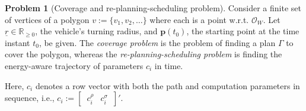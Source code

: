 \documentclass[letterpaper,10pt,journal,twoside]{IEEEtran}
\theoremstyle{definition}
\newtheorem*{pb}{Problem}%
\begin{document}
\begin{pb}[Coverage and re-planning-scheduling problem]
  \label{pb:cov-pb}
  Consider a finite set of vertices of a polygon $v:=\{v_1,v_2,\dots\}$ where each %
  is a point w.r.t. $\mathcal{O}_W$. 
  Let $\underline{r}\in\mathbb{R}_{\geq 0}$, the vehicle's turning radius, and $\mathbf{p}(t_0)$, the starting point at the time instant $t_0$, be given. 
  The \emph{coverage problem} is the problem of finding a plan $\Gamma$ to cover the polygon, whereas the \emph{re-planning-scheduling problem} is finding the {\color{blue}energy-aware} trajectory of parameters $c_i$ in time.
\end{pb}    



Here, $c_i$ denotes a row vector with both the path and computation parameters in sequence, i.e., $c_i:=[\begin{matrix}\,c_i^\rho & c_i^\sigma\,\end{matrix}]'$. %



\end{document}
